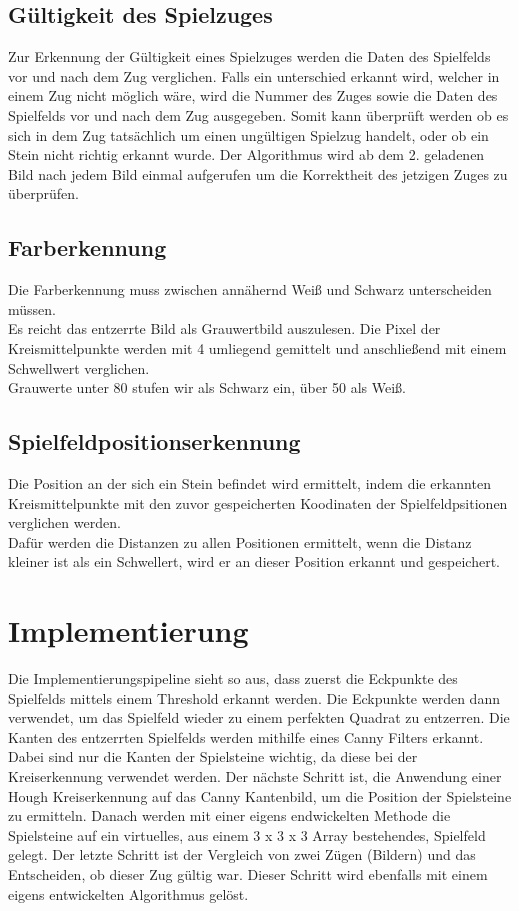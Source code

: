 \documentclass[paper=A4, deutsch]{scrartcl}
\begin{document}
\subsection{Gültigkeit des Spielzuges}
Zur Erkennung der Gültigkeit eines Spielzuges werden die Daten des Spielfelds vor und nach dem Zug verglichen. Falls ein unterschied erkannt wird, welcher in einem Zug nicht möglich wäre, wird die Nummer des Zuges sowie die Daten des Spielfelds vor und nach dem Zug ausgegeben. Somit kann überprüft werden ob es sich in dem Zug tatsächlich um einen ungültigen Spielzug handelt, oder ob ein Stein nicht richtig erkannt wurde.
Der Algorithmus wird ab dem 2. geladenen Bild nach jedem Bild einmal aufgerufen um die Korrektheit des jetzigen Zuges zu überprüfen.


\subsection{Farberkennung}
Die Farberkennung muss zwischen annähernd Weiß und Schwarz unterscheiden müssen. \\
Es reicht das entzerrte Bild als Grauwertbild auszulesen. Die Pixel der Kreismittelpunkte
werden mit 4 umliegend gemittelt und anschließend mit einem Schwellwert verglichen.\\
Grauwerte unter 80 stufen wir als Schwarz ein, über 50 als Weiß.

\subsection{Spielfeldpositionserkennung}
Die Position an der sich ein Stein befindet wird ermittelt, indem die erkannten Kreismittelpunkte
mit den zuvor gespeicherten Koodinaten der Spielfeldpsitionen verglichen werden.\\
Dafür werden die Distanzen zu allen Positionen ermittelt, 
wenn die Distanz kleiner ist als ein Schwellert,  wird er an dieser Position erkannt und gespeichert.

\section{Implementierung}
Die Implementierungspipeline sieht so aus, dass zuerst die Eckpunkte des Spielfelds mittels  einem Threshold erkannt werden. Die Eckpunkte werden dann verwendet, um das Spielfeld wieder zu einem perfekten Quadrat zu entzerren. Die Kanten des entzerrten Spielfelds werden mithilfe eines Canny Filters erkannt. Dabei sind nur die Kanten der Spielsteine wichtig, da diese bei der Kreiserkennung verwendet werden. Der nächste Schritt ist, die Anwendung einer Hough Kreiserkennung auf das Canny Kantenbild, um die Position der Spielsteine zu ermitteln. Danach werden mit einer eigens endwickelten Methode die Spielsteine auf ein virtuelles, aus einem 3 x 3 x 3 Array bestehendes, Spielfeld gelegt. Der letzte Schritt ist der Vergleich von zwei Zügen (Bildern) und das Entscheiden, ob dieser Zug gültig war. Dieser Schritt wird ebenfalls mit einem eigens entwickelten Algorithmus gelöst.
\end{document}
